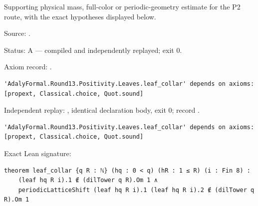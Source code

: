 \begin{theorem}[bp-442]
\label{bp-442}
\leanok
Supporting physical mass, full-color or periodic-geometry estimate for the P2 route, with the exact hypotheses displayed below.

\par Source: \texttt{}.
\par Status: A — compiled and independently replayed; exit 0.
\par Axiom record: \texttt{}.
\begin{verbatim}
'AdalyFormal.Round13.Positivity.Leaves.leaf_collar' depends on axioms: [propext, Classical.choice, Quot.sound]
\end{verbatim}
\par Independent replay: \texttt{}, identical declaration body, exit 0; record \texttt{}.
\begin{verbatim}
'AdalyFormal.Round13.Positivity.Leaves.leaf_collar' depends on axioms: [propext, Classical.choice, Quot.sound]
\end{verbatim}
\par Exact Lean signature:
\begin{verbatim}
theorem leaf_collar {q R : ℕ} (hq : 0 < q) (hR : 1 ≤ R) (i : Fin 8) :
    (leaf hq R i).1 ∉ (dilTower q R).Om 1 ∧
    periodicLatticeShift (leaf hq R i).1 (leaf hq R i).2 ∉ (dilTower q R).Om 1
\end{verbatim}
\end{theorem}

